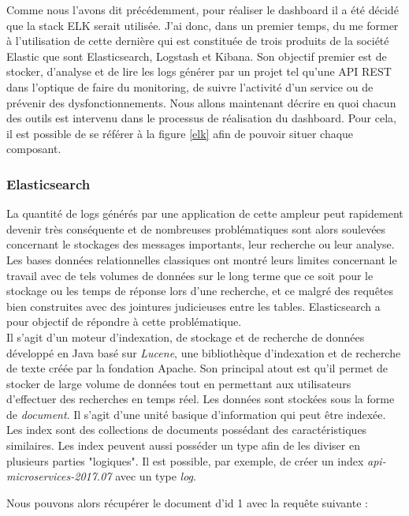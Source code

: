 	Comme nous l'avons dit précédemment, pour réaliser le dashboard il a été décidé que la stack ELK serait utilisée. J'ai donc, dans un premier temps, du me former à l'utilisation de cette dernière qui est constituée de trois produits de la société Elastic que sont Elasticsearch, Logstash et Kibana. Son objectif premier est de stocker, d'analyse et de lire les logs générer par un projet tel qu'une API REST dans l'optique de faire du monitoring, de suivre l'activité d'un service ou de prévenir des dysfonctionnements. Nous allons maintenant décrire en quoi chacun des outils est intervenu dans le processus de réalisation du dashboard. Pour cela, il est possible de se référer à la figure \ref{elk} afin de pouvoir situer chaque composant.

	\subsubsection{Elasticsearch}
	La quantité de logs générés par une application de cette ampleur peut rapidement devenir très conséquente et de nombreuses problématiques sont alors soulevées concernant le stockages des messages importants, leur recherche ou leur analyse. Les bases données relationnelles classiques ont montré leurs limites concernant le travail avec de tels volumes de données sur le long terme que ce soit pour le stockage ou les temps de réponse lors d'une recherche, et ce malgré des requêtes bien construites avec des jointures judicieuses entre les tables. Elasticsearch a pour objectif de répondre à cette problématique. \\
	
	Il s'agit d'un moteur d'indexation, de stockage et de recherche de données développé en Java basé sur \textit{Lucene}, une bibliothèque d'indexation et de recherche de texte créée par la fondation Apache. Son principal atout est qu'il permet de stocker de large volume de données tout en permettant aux utilisateurs d'effectuer des recherches en temps réel. Les données sont stockées sous la forme de \textit{document}. Il s'agit d'une unité basique d'information qui peut être indexée. Les index sont des collections de documents possédant des caractéristiques similaires. Les index peuvent aussi posséder un type afin de les diviser en plusieurs parties "logiques". Il est possible, par exemple, de créer un index \textit{api-microservices-2017.07} avec un type \textit{log}. 
	
	Nous pouvons alors récupérer le document d'id 1 avec la requête suivante :	

